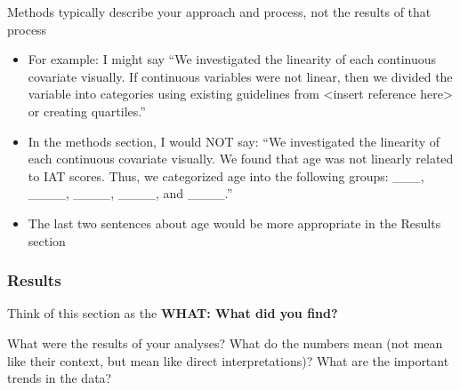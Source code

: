 \documentclass[
  letterpaper,
  DIV=11,
  numbers=noendperiod]{scrartcl}
\providecommand{\tightlist}{%
  \setlength{\itemsep}{0pt}\setlength{\parskip}{0pt}}
\begin{document}
\begin{tcolorbox}[enhanced jigsaw, arc=.35mm, bottomrule=.15mm, bottomtitle=1mm, breakable, colback=white, colbacktitle=quarto-callout-caution-color!10!white, colframe=quarto-callout-caution-color-frame, coltitle=black, left=2mm, leftrule=.75mm, opacityback=0, opacitybacktitle=0.6, rightrule=.15mm, title=\textcolor{quarto-callout-caution-color}{\faFire}\hspace{0.5em}{Important to keep in mind}, titlerule=0mm, toprule=.15mm, toptitle=1mm]

Methods typically describe your approach and process, not the results of
that process

\begin{itemize}
\tightlist
\item
  For example: I might say ``We investigated the linearity of each
  continuous covariate visually. If continuous variables were not
  linear, then we divided the variable into categories using existing
  guidelines from \textless insert reference here\textgreater{} or
  creating quartiles.''
\item
  In the methods section, I would NOT say: ``We investigated the
  linearity of each continuous covariate visually. We found that age was
  not linearly related to IAT scores. Thus, we categorized age into the
  following groups: \_\_\_, \_\_\_\_, \_\_\_\_, \_\_\_\_, and
  \_\_\_\_.''
\item
  The last two sentences about age would be more appropriate in the
  Results section
\end{itemize}

\end{tcolorbox}

\subsubsection{Results}\label{results}

\begin{tcolorbox}[enhanced jigsaw, arc=.35mm, bottomrule=.15mm, bottomtitle=1mm, breakable, colback=white, colbacktitle=quarto-callout-caution-color!10!white, colframe=quarto-callout-caution-color-frame, coltitle=black, left=2mm, leftrule=.75mm, opacityback=0, opacitybacktitle=0.6, rightrule=.15mm, title=\textcolor{quarto-callout-caution-color}{\faFire}\hspace{0.5em}{Caution}, titlerule=0mm, toprule=.15mm, toptitle=1mm]

Think of this section as the \textbf{WHAT: What did you find?}

What were the results of your analyses? What do the numbers mean (not
mean like their context, but mean like direct interpretations)? What are
the important trends in the data?

\end{tcolorbox}
\end{document}
